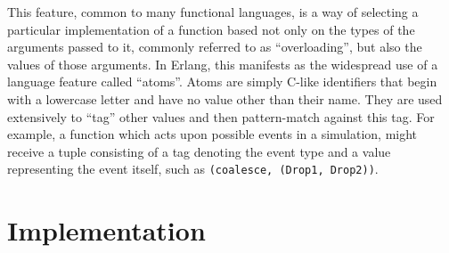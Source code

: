 \documentclass[twocolumn,a4paper,10pt]{article}
\begin{document}
This feature, common to many functional languages, is a way of selecting a
particular implementation of a function based not only on the types of the
arguments passed to it, commonly referred to as ``overloading'', but also the
values of those arguments. In Erlang, this manifests as the widespread use of a
language feature called ``atoms''. Atoms are simply C-like identifiers that
begin with a lowercase letter and have no value other than their name. They are
used extensively to ``tag'' other values and then pattern-match against this
tag. For example, a function which acts upon possible events in a simulation,
might receive a tuple consisting of a tag denoting the event type and a value
representing the event itself, such as \texttt{(coalesce, (Drop1, Drop2))}.

\section{Implementation}





\clearpage
\nocite{*}


\end{document}
